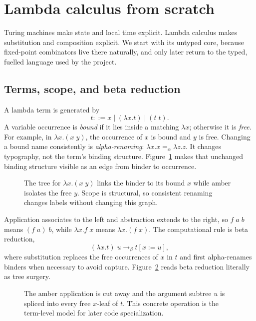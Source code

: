 \section{Lambda calculus from scratch}
\label{sec:refresher-lambda}

Turing machines make state and local time explicit.  Lambda calculus makes
substitution and composition explicit.  We start with its untyped core,
because fixed-point combinators live there naturally, and only later return to
the typed, fuelled language used by the project.

\subsection{Terms, scope, and beta reduction}

A lambda term is generated by
\[
 t ::= x \mid (\lambda x.t) \mid (t\;t).
\]
A variable occurrence is \emph{bound} if it lies inside a matching
\(\lambda x\); otherwise it is \emph{free}.  For example, in
\(\lambda x.(x\;y)\), the occurrence of \(x\) is bound and \(y\) is free.
Changing a bound name consistently is \emph{alpha-renaming}:
\(\lambda x.x=_{\alpha}\lambda z.z\).  It changes typography, not the term's
binding structure.
Figure~\ref{fig:term-tree-scope} makes that unchanged binding structure
visible as an edge from binder to occurrence.

\begin{figure}[ht]
\centering

\caption{The tree for $\lambda x.(x\;y)$ links the binder to its bound $x$ while amber isolates the free $y$.  Scope is structural, so consistent renaming changes labels without changing this graph.}
\label{fig:term-tree-scope}
\end{figure}

Application associates to the left and abstraction extends to the right, so
\(f\;a\;b\) means \((f\;a)\;b\), while \(\lambda x.f\;x\) means
\(\lambda x.(f\;x)\).  The computational rule is beta reduction,
\[
 (\lambda x.t)\;u\longrightarrow_\beta t[x:=u],
\]
where substitution replaces the free occurrences of \(x\) in \(t\) and first
alpha-renames binders when necessary to avoid capture.
Figure~\ref{fig:beta-tree-surgery} reads beta reduction literally as tree
surgery.

\begin{figure}[ht]
\centering

\caption{The amber application is cut away and the argument subtree $u$ is spliced into every free $x$-leaf of $t$.  This concrete operation is the term-level model for later code specialization.}
\label{fig:beta-tree-surgery}
\end{figure}

